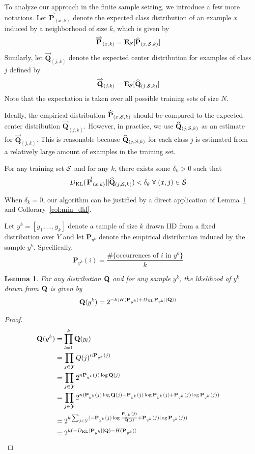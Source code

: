 \documentclass{article}
\newtheorem{lemma}[theorem]{Lemma}
\begin{document}
\newcommand{\Pexpected}{\overrightarrow{\mathbf{P}}_{(x,k)}}
\newcommand{\Qexpected}{\overrightarrow{\mathbf{Q}}_{(j,k)}}

To analyze our approach in the finite sample setting, we introduce a few
more notations. Let $\Pexpected$ denote the expected class
distribution of an example $x$ induced by a neighborhood of size $k$,
which is given by
\[
\Pexpected = \mathbf{E}_{\trainset}[\Pemp]
\]
Similarly, let $\Qexpected$ denote the expected center distribution
for examples of class $j$ defined by
\[
\Qexpected =\mathbf{E}_{\trainset}[\Qemp]
\]
Note that the expectation is taken over all possible training sets of
size $N$.

Ideally, the empirical distribution $\widehat{\mathbf{P}}_{(x,\mathcal{S},k)}$ should be compared to the
expected center distribution $\Qexpected$. However, in practice, we
use $\widehat{\mathbf{Q}}_{(j,\mathcal{S},k)}$ as an estimate for $\Qexpected$. This is reasonable
because $\widehat{\mathbf{Q}}_{(j,\mathcal{S},k)}$ for each class $j$ is estimated from a relatively
large amount of examples in the training set.

For any training set $\mathcal{S}$ and for any $k$, there exists some
$\delta_k > 0$ such that
\[
\dkl(\Pexpected || \Qemp) < \delta_k \; \forall \; (x,j) \in \trainset
\]

When $\delta_k = 0$, our algorithm can be justified by a direct
application of Lemma~\ref{lemma:dkl} and Collorary~\ref{col:min_dkl}.

\newcommand{\sampleYK}{y^k}
\newcommand{\sampleEmpDist}{\mathbf{P}_{y^k}}

Let $\sampleYK = [y_1, \ldots, y_k]$ denote a sample of size $k$ drawn IID
from a fixed distribution over $Y$ and let $\sampleEmpDist$ denote the
empirical distribution induced by the sample
$\sampleYK$. Specifically,
\[
\sampleEmpDist(i) = \frac{\#\{ \mbox{occurrences of } i \mbox{ in } y^k\}}{k}
\]

\begin{lemma}
\label{lemma:dkl}
For any distribution $\mathbf{Q}$ and for any sample $\sampleYK$, the
likelihood of $\sampleYK$ drawn from $\mathbf{Q}$ is given by
\[
\Q(y^k) = 2^{-k(H(\sampleEmpDist) + \dkl\sampleEmpDist || \Q))}
\]
\end{lemma}
\begin{proof}
  \begin{align*}
    \Q(y^k) 
&= \prod_{l=1}^k \Q(y_l)\\ 
&= \prod_{j \in \Y} Q(j)^{n\sampleEmpDist(j)}\\ 
&= \prod_{j \in \Y} 2^{n\sampleEmpDist(j) \log \Q(j)}\\ 
&= \prod_{j \in \Y} 2^{n(\sampleEmpDist(j) \log \Q(j) - \sampleEmpDist(j) \log \sampleEmpDist(j) + \sampleEmpDist(j) \log \sampleEmpDist(j))}\\ 
&= 2^{k \sum_{j \in \Y} (-\sampleEmpDist(j) \log \frac{\sampleEmpDist(j)}{\Q(j)} + \sampleEmpDist(j) \log \sampleEmpDist(j))}\\ 
&= 2^{k(-\dkl(\sampleEmpDist||\Q) - H(\sampleEmpDist))}\\
  \end{align*}
\end{proof}
\end{document}
